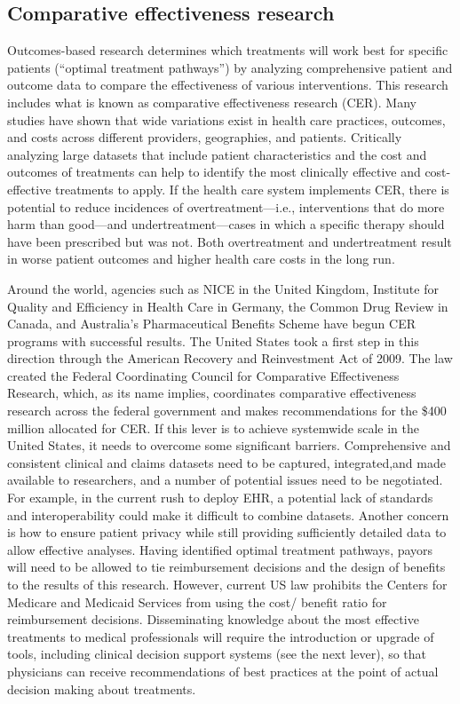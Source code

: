 \documentclass[twocolumn]{article}
\begin{document}
\subsection{Comparative effectiveness research}
Outcomes-based research determines which treatments will work best for specific patients (“optimal treatment pathways”) by analyzing comprehensive patient and outcome data to compare the effectiveness of various interventions. This research includes what is known as comparative effectiveness research (CER). Many studies have shown that wide variations exist in health care practices, outcomes, and costs across different providers, geographies, and patients. Critically analyzing large datasets that include patient characteristics and the cost and outcomes of treatments can help to identify the most clinically effective and cost-effective treatments to apply. If the health care system implements CER, there is potential to reduce incidences of overtreatment—i.e., interventions that do more harm than good—and undertreatment—cases in which a specific therapy should have been prescribed but was not. Both overtreatment and undertreatment result in worse patient outcomes and higher health care costs in the long run. 

Around the world, agencies such as NICE in the United Kingdom, 
Institute for Quality and Efficiency in Health Care in Germany, the Common Drug Review in Canada, and Australia’s Pharmaceutical Benefits Scheme have begun CER programs with successful results. The United States took a first step in this direction through the American Recovery and Reinvestment Act of 2009. The law created the Federal Coordinating Council for Comparative Effectiveness Research, which, as its name implies, coordinates comparative effectiveness research across the federal government and makes recommendations for the \$400 million allocated for CER. If this lever is to achieve systemwide scale in the United States, it needs to overcome some significant barriers. Comprehensive and consistent clinical and claims datasets need to be captured, integrated,and made available to researchers, and a number of potential issues need to be negotiated. For example, in the current rush to deploy EHR, a potential lack of standards and interoperability could make it difficult to combine datasets. Another concern is how to ensure patient privacy while still providing sufficiently detailed data to allow effective analyses. Having identified optimal treatment pathways, payors will need to be allowed to tie reimbursement decisions and the design of benefits to the results of this research. However, current US law prohibits the Centers for Medicare and Medicaid Services from using the cost/ benefit ratio for reimbursement decisions. Disseminating knowledge about the most effective treatments to medical professionals will require the introduction or upgrade of tools, including clinical decision support systems (see the next lever), so that physicians can receive recommendations of best practices at the point of actual decision making about treatments.
\end{document}
